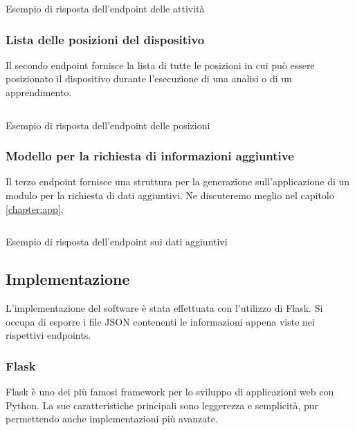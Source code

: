 \newpage
\begin{listing}[H] 
    \inputminted[frame=single,framesep=10pt]{json}{assets/snippets/server/api/activities.json}
    \caption{Esempio di risposta dell'endpoint delle attività}
    \label{listing:response-activities}
\end{listing}

\newpage
\subsubsection{Lista delle posizioni del dispositivo}
Il secondo endpoint fornisce la lista di tutte le posizioni in cui può essere posizionato il dispositivo durante l'esecuzione 
di una analisi o di un apprendimento.

\begin{listing}[H] 
    \inputminted[frame=single,framesep=10pt]{json}{assets/snippets/server/api/positions.json}
    \caption{Esempio di risposta dell'endpoint delle posizioni}
    \label{listing:response-positions}
\end{listing}

\newpage
\subsubsection{Modello per la richiesta di informazioni aggiuntive}
Il terzo endpoint fornisce una struttura per la generazione sull'applicazione di un modulo per la richiesta di dati aggiuntivi. 
Ne discuteremo meglio nel capitolo \ref{chapter:app}.

\begin{listing}[H] 
    \inputminted[frame=single,framesep=10pt]{json}{assets/snippets/server/api/form.json}
    \caption{Esempio di risposta dell'endpoint sui dati aggiuntivi}
    \label{listing:response-form}
\end{listing}

\subsection{Implementazione}
L'implementazione del software è stata effettuata con l'utilizzo di Flask. Si occupa di esporre i 
file JSON contenenti le informazioni appena viste nei rispettivi endpoints.

\subsubsection{Flask}
Flask \cite{flask} è uno dei più famosi framework per lo sviluppo di applicazioni web 
con Python. La sue caratteristiche principali sono leggerezza e semplicità, pur permettendo anche implementazioni 
più avanzate.


